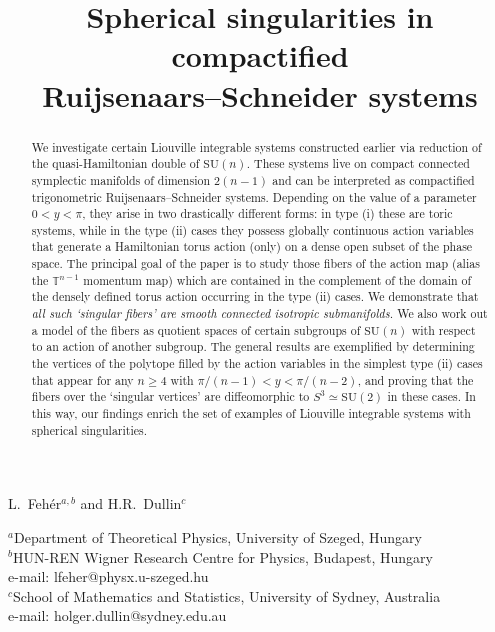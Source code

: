 \documentclass[a4paper,11pt,reqno]{amsart}
\theoremstyle{definition}
\numberwithin{equation}{section}
\def\bT{{\mathbb T}}                        %
\def\SU{\mathrm{SU}}                        %
\begin{document}
\title{Spherical singularities  in compactified \\ Ruijsenaars--Schneider  systems
}


\maketitle


\begin{center}


L.~Feh\'er${}^{a,b}$  and H.R.~Dullin${}^c$  \\

\bigskip


${}^a$Department of Theoretical Physics, University of Szeged, Hungary\\
${}^b$HUN-REN Wigner Research Centre for Physics, Budapest, Hungary\\
e-mail: lfeher@physx.u-szeged.hu \\
${}^c$School of Mathematics and Statistics, University of Sydney, Australia\\
e-mail: holger.dullin@sydney.edu.au


\end{center}


\begin{abstract}
We investigate certain Liouville integrable systems
constructed earlier
via reduction of the quasi-Hamiltonian double of $\SU(n)$.
These systems
live on compact connected symplectic manifolds of dimension $2(n-1)$ and
 can be interpreted as
compactified trigonometric Ruijsenaars--Schneider systems.
Depending on the value of a parameter $0<y< \pi$, they arise in two drastically different forms:
in type (i) these are toric systems, while in the type (ii) cases they possess globally continuous
action variables that generate a Hamiltonian torus action (only) on a dense
open subset of the phase space.
The principal goal of the paper is to study those fibers of the action map
(alias the $\bT^{n-1}$ momentum map)
which are contained in the complement
of the domain of the densely defined torus action occurring in the type (ii) cases.
We demonstrate that \emph{all such `singular fibers'
are smooth connected isotropic submanifolds.}
We also work out a model of the fibers as quotient spaces of certain
subgroups of $\SU(n)$ with respect to an action of another subgroup.
The general results are exemplified by determining  the vertices
of the polytope filled by the action variables in the
simplest type (ii) cases that appear for any $n\geq 4$  with $\pi/(n-1) <y < \pi/(n-2)$,
and proving that the fibers
over the `singular vertices' are diffeomorphic to
 $S^3 \simeq \SU(2)$ in these cases.
In this way, our findings enrich the set of examples of Liouville
integrable systems with spherical singularities.
 \end{abstract}
\end{document}
